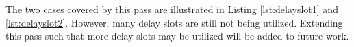 The two cases covered by this pass are illustrated in Listing \ref{lst:delayslot1} and \ref{lst:delayslot2}. However, many delay slots are still not being utilized. Extending this pass such that more delay slots may be utilized will be added to future work.


